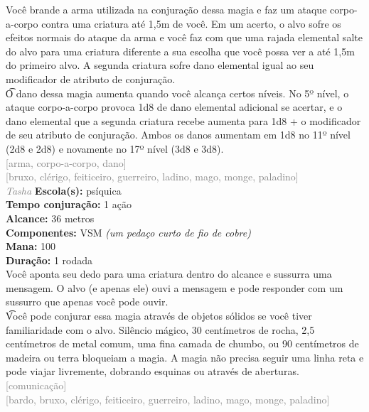 \documentclass{RPG_Adventure}[2021/10/20]
\begin{document}
{\normalsize Você brande a arma utilizada na conjuração dessa magia e faz um ataque corpo-a-corpo contra uma criatura até 1,5m de você. Em um acerto, o alvo sofre os efeitos normais do ataque da arma e você faz com que uma rajada elemental salte do alvo para uma criatura diferente a sua escolha que você possa ver a até 1,5m do primeiro alvo. A segunda criatura sofre dano elemental igual ao seu modificador de atributo de conjuração.\\\t O dano dessa magia aumenta quando você alcança certos níveis. No 5º nível, o ataque corpo-a-corpo provoca 1d8 de dano elemental adicional se acertar, e o dano elemental que a segunda criatura recebe aumenta para 1d8 + o modificador de seu atributo de conjuração. Ambos os danos aumentam em 1d8 no 11º nível (2d8 e 2d8) e novamente no 17º nível (3d8 e 3d8).\\}
{\scriptsize \textcolor{gray}{[arma, corpo-a-corpo, dano]\\}}
{\scriptsize \textcolor{gray}{[bruxo, clérigo, feiticeiro, guerreiro, ladino, mago, monge, paladino]\\}}
{\tiny \textcolor{gray}{\textit{Tasha}}}
{\small \t \textbf{Escola(s):} psíquica\\\t \textbf{Tempo conjuração:} 1 ação\\\t \textbf{Alcance:} 36 metros\\\t \textbf{Componentes:} VSM \textit{(um pedaço curto de fio de cobre)}\\\t \textbf{Mana:} 100\\\t \textbf{Duração:} 1 rodada\\}
{\normalsize Você aponta seu dedo para uma criatura dentro do alcance e sussurra uma mensagem. O alvo (e apenas ele) ouvi a mensagem e pode responder com um sussurro que apenas você pode ouvir.\\\t Você pode conjurar essa magia através de objetos sólidos se você tiver familiaridade com o alvo. Silêncio mágico, 30 centímetros de rocha, 2,5 centímetros de metal comum, uma fina camada de chumbo, ou 90 centímetros de madeira ou terra bloqueiam a magia. A magia não precisa seguir uma linha reta e pode viajar livremente, dobrando esquinas ou através de aberturas.\\}
{\scriptsize \textcolor{gray}{[comunicação]\\}}
{\scriptsize \textcolor{gray}{[bardo, bruxo, clérigo, feiticeiro, guerreiro, ladino, mago, monge, paladino]\\}}
\end{document}
